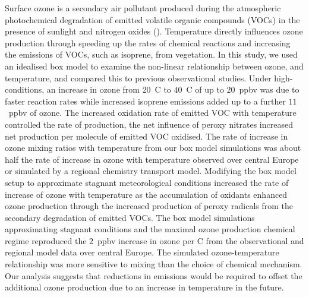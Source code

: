 Surface ozone is a secondary air pollutant produced during the atmospheric photochemical degradation of emitted volatile organic compounds (VOCs) in the presence of sunlight and nitrogen oxides (). 
Temperature directly influences ozone production through speeding up the rates of chemical reactions and increasing the emissions of VOCs, such as isoprene, from vegetation.
In this study, we used an idealised box model to examine the non-linear relationship between ozone,  and temperature, and compared this to previous observational studies.
Under high- conditions, an increase in ozone from $20$~\degree C to $40$~\degree C of up to $20$~ppbv was due to faster reaction rates while increased isoprene emissions added up to a further $11$~ppbv of ozone.
The increased oxidation rate of emitted VOC with temperature controlled the rate of  production, the net influence of peroxy nitrates increased net  production per molecule of emitted VOC oxidised.
The rate of increase in ozone mixing ratios with temperature from our box model simulations was about half the rate of increase in ozone with temperature observed over central Europe or simulated by a regional chemistry transport model.
Modifying the box model setup to approximate stagnant meteorological conditions increased the rate of increase of ozone with temperature as the accumulation of oxidants enhanced ozone production through the increased production of peroxy radicals from the secondary degradation of emitted VOCs.
The box model simulations approximating stagnant conditions and the maximal ozone production chemical regime reproduced the $2$~ppbv increase in ozone per \degree C from the observational and regional model data over central Europe.
The simulated ozone-temperature relationship was more sensitive to mixing than the choice of chemical mechanism.
Our analysis suggests that reductions in  emissions would be required to offset the additional ozone production due to an increase in temperature in the future.
